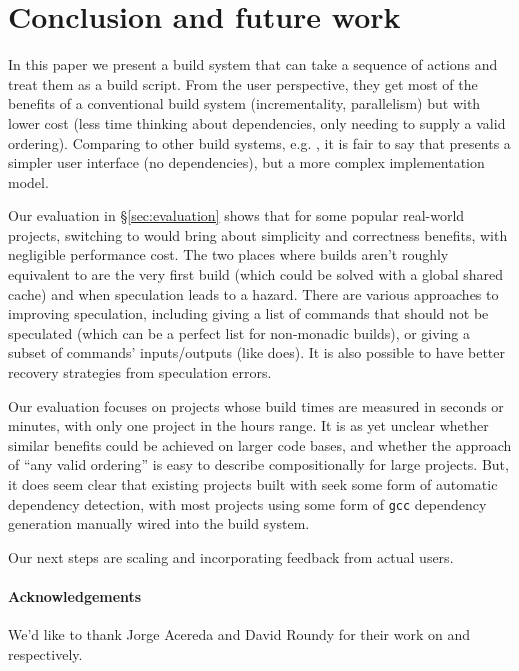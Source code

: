 \section{Conclusion and future work}
\label{sec:conclusion}

In this paper we present a build system that can take a sequence of actions and treat them as a build script. From the user perspective, they get most of the benefits of a conventional build system (incrementality, parallelism) but with lower cost (less time thinking about dependencies, only needing to supply a valid ordering). Comparing \Rattle to other build systems, e.g. \Make, it is fair to say that \Rattle presents a simpler user interface (no dependencies), but a more complex implementation model.

Our evaluation in \S\ref{sec:evaluation} shows that for some popular real-world projects, switching to \Rattle would bring about simplicity and correctness benefits, with negligible performance cost. The two places where builds aren't roughly equivalent to \Make are the very first build (which could be solved with a global shared cache) and when speculation leads to a hazard. There are various approaches to improving speculation, including giving \Rattle a list of commands that should not be speculated (which can be a perfect list for non-monadic builds), or giving \Rattle a subset of commands' inputs/outputs (like \Fac does). It is also possible to have better recovery strategies from speculation errors.

Our evaluation focuses on projects whose build times are measured in seconds or minutes, with only one project in the hours range. It is as yet unclear whether similar benefits could be achieved on larger code bases, and whether the \Rattle approach of ``any valid ordering'' is easy to describe compositionally for large projects.  But, it does seem clear that existing projects built with \Make seek some form of automatic dependency detection, with most projects using some form of \texttt{gcc} dependency generation manually wired into the build system.

Our next steps are scaling \Rattle and incorporating feedback from actual users.


\paragraph{Acknowledgements} We'd like to thank Jorge Acereda and David Roundy for their work on \Fsatrace and \Bigbro respectively.
